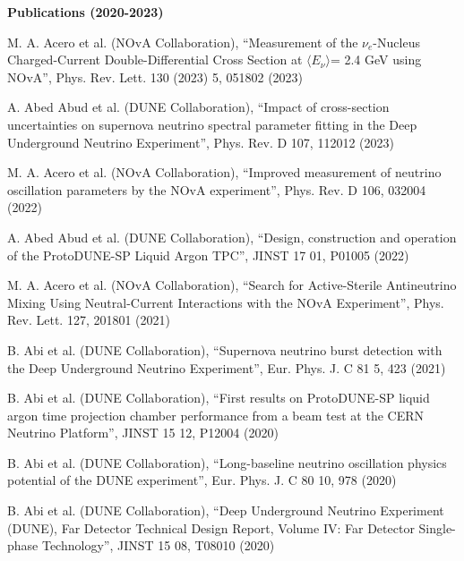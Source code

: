 {\bf Publications (2020-2023)}
\begin{list2}
\item M. A. Acero et al. (NOvA Collaboration), ``Measurement of the $\nu_e$-Nucleus Charged-Current Double-Differential Cross Section at $\langle E_\nu\rangle$= 2.4 GeV using NOvA'', Phys. Rev. Lett. 130 (2023) 5, 051802 (2023)
\item A. Abed Abud et al. (DUNE Collaboration), ``Impact of cross-section uncertainties on supernova neutrino spectral parameter fitting in the Deep Underground Neutrino Experiment'', Phys. Rev. D 107, 112012 (2023)
\item M. A. Acero et al. (NOvA Collaboration), ``Improved measurement of neutrino oscillation parameters by the NOvA experiment'', Phys. Rev. D 106, 032004 (2022)
\item A. Abed Abud et al. (DUNE Collaboration), ``Design, construction and operation of the ProtoDUNE-SP Liquid Argon TPC'', JINST 17 01, P01005 (2022)
\item M. A. Acero et al. (NOvA Collaboration), ``Search for Active-Sterile Antineutrino Mixing Using Neutral-Current Interactions with the NOvA Experiment'', Phys. Rev. Lett. 127, 201801 (2021)
\item B. Abi et al. (DUNE Collaboration), ``Supernova neutrino burst detection with the Deep Underground Neutrino Experiment'', Eur. Phys. J. C 81 5, 423 (2021)
\item B. Abi et al. (DUNE Collaboration), ``First results on ProtoDUNE-SP liquid argon time projection chamber performance from a beam test at the CERN Neutrino Platform'', JINST 15 12, P12004 (2020)
\item B. Abi et al. (DUNE Collaboration), ``Long-baseline neutrino oscillation physics potential of the DUNE experiment'', Eur. Phys. J. C 80 10, 978 (2020)
\item B. Abi et al. (DUNE Collaboration), ``Deep Underground Neutrino Experiment (DUNE), Far Detector Technical Design Report, Volume IV: Far Detector Single-phase Technology'', JINST 15 08, T08010 (2020)
\end{list2}

